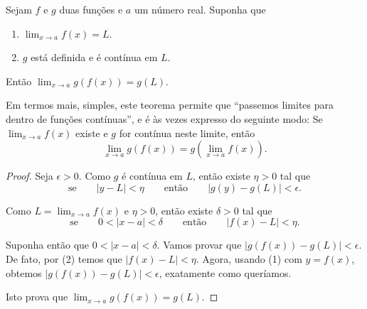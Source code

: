 \begin{theorem}
	Sejam $f$ e $g$ duas funções e $a$ um número real. Suponha que
	\begin{enumerate}
		\item $\lim_{x\to a}f(x)=L$.
		\item $g$ está definida e é contínua em $L$.
	\end{enumerate}
	Então $\lim_{x\to a}g(f(x))=g(L)$.
\end{theorem}

Em termos mais, simples, este teorema permite que ``passemos limites para dentro de funções contínuas'', e é às vezes expresso do seguinte modo: Se $\lim_{x\to a}f(x)$ existe e $g$ for contínua neste limite, então
\[\lim_{x\to a}g(f(x))=g\left(\lim_{x\to a}f(x)\right).\]

\begin{proof}
	Seja $\epsilon>0$. Como $g$ é contínua em $L$, então existe $\eta>0$ tal que
	\[\text{se}\qquad |y-L|<\eta\qquad\text{então}\qquad|g( y )-g(L)|<\epsilon.\tag{1}\]
	
	Como $L=\lim_{x\to a}f(x)$ e $\eta>0$, então existe $\delta>0$ tal que
	\[\text{se}\qquad 0<|x-a|<\delta\qquad\text{então}\qquad|f(x)-L|<\eta.\tag{2}\]
	
	Suponha então que $0<|x-a|<\delta$. Vamos provar que $|g(f(x))-g(L)|<\epsilon$. De fato, por (2) temos que $|f(x)-L|<\eta$. Agora, usando (1) com $y=f(x)$, obtemos $|g(f(x))-g(L)|< \epsilon$, exatamente como queríamos.
	
	Isto prova que $\lim_{x\to a}g(f(x))=g(L)$.
\end{proof}
	